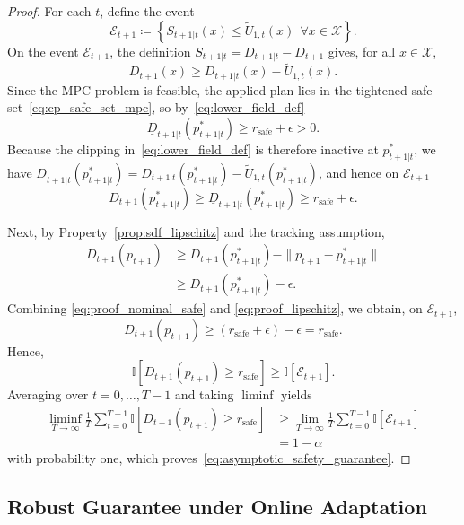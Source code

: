 \documentclass[lettersize,journal]{IEEEtran}
\begin{document}
\begin{proof}
For each $t$, define the event
\[
\mathcal E_{t+1}
\coloneqq
\left\{
S_{t+1|t}(x)\le \widetilde U_{1,t}(x)\ \ \forall x\in\mathcal X
\right\}.
\]
On the event $\mathcal E_{t+1}$, the definition $S_{t+1|t}=D_{t+1|t}-D_{t+1}$ gives, for all $x\in\mathcal X$,
\[
D_{t+1}(x)\ge D_{t+1|t}(x)-\widetilde U_{1,t}(x).
\]
Since the MPC problem is feasible, the applied plan lies in the tightened safe set~\eqref{eq:cp_safe_set_mpc}, so by~\eqref{eq:lower_field_def}
\begin{equation}
\underline D_{t+1|t}(p^*_{t+1|t}) \ge r_{\mathrm{safe}}+\epsilon > 0.
\label{eq:proof_feas_tight}
\end{equation}
Because the clipping in~\eqref{eq:lower_field_def} is therefore inactive at $p^*_{t+1|t}$, we have $\underline D_{t+1|t}(p^*_{t+1|t})=D_{t+1|t}(p^*_{t+1|t})-\widetilde U_{1,t}(p^*_{t+1|t})$, and hence on $\mathcal E_{t+1}$
\begin{equation}
D_{t+1}(p^*_{t+1|t})
\ge
\underline D_{t+1|t}(p^*_{t+1|t})
\ge
r_{\mathrm{safe}}+\epsilon.
\label{eq:proof_nominal_safe}
\end{equation}

Next, by Property~\ref{prop:sdf_lipschitz} and the tracking assumption,
\begin{equation}
\begin{aligned}
D_{t+1}(p_{t+1})
&\ge
D_{t+1}(p^*_{t+1|t})-\|p_{t+1}-p^*_{t+1|t}\| \\
&\ge
D_{t+1}(p^*_{t+1|t})-\epsilon.
\end{aligned}
\label{eq:proof_lipschitz}
\end{equation}
Combining \eqref{eq:proof_nominal_safe} and \eqref{eq:proof_lipschitz}, we obtain, on $\mathcal E_{t+1}$,
\[
D_{t+1}(p_{t+1}) \ge (r_{\mathrm{safe}}+\epsilon)-\epsilon = r_{\mathrm{safe}}.
\]
Hence,
\[
\mathbb I\!\left[D_{t+1}(p_{t+1})\ge r_{\mathrm{safe}}\right]
\ge
\mathbb I[\mathcal E_{t+1}].
\]
Averaging over $t=0,\dots,T-1$ and taking $\liminf$ yields
\[
\begin{aligned}
\liminf_{T\to\infty}
\frac{1}{T}\sum_{t=0}^{T-1}
\mathbb I\!\left[D_{t+1}(p_{t+1})\ge r_{\mathrm{safe}}\right]
&\ge
\lim_{T\to\infty}
\frac{1}{T}\sum_{t=0}^{T-1}\mathbb I[\mathcal E_{t+1}] \\
&=
1-\alpha
\end{aligned}
\]
with probability one, which proves~\eqref{eq:asymptotic_safety_guarantee}.
\end{proof}

\subsection{Robust Guarantee under Online Adaptation}
\end{document}
